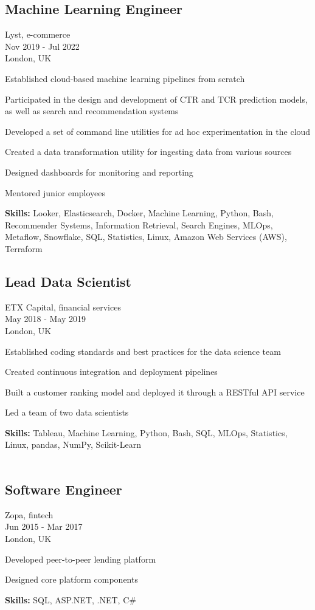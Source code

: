 \documentclass[a4paper,10pt]{article}
\begin{document}
\subsection*{Machine Learning Engineer}
Lyst, e-commerce \\
Nov 2019 - Jul 2022 \\
London, UK
\begin{bulletlist}
    \item Established cloud-based machine learning pipelines from scratch
    \item Participated in the design and development of CTR and TCR prediction models, as well as search and recommendation systems
    \item Developed a set of command line utilities for ad hoc experimentation in the cloud
    \item Created a data transformation utility for ingesting data from various sources
    \item Designed dashboards for monitoring and reporting
    \item Mentored junior employees
\end{bulletlist}
\textbf{Skills:} Looker, Elasticsearch, Docker, Machine Learning, Python, Bash, Recommender Systems, Information Retrieval, Search Engines, MLOps, Metaflow, Snowflake, SQL, Statistics, Linux, Amazon Web Services (AWS), Terraform

\subsection*{Lead Data Scientist}
ETX Capital, financial services \\
May 2018 - May 2019 \\
London, UK
\begin{bulletlist}
    \item Established coding standards and best practices for the data science team
    \item Created continuous integration and deployment pipelines
    \item Built a customer ranking model and deployed it through a RESTful API service
    \item Led a team of two data scientists
\end{bulletlist}
\textbf{Skills: }Tableau, Machine Learning, Python, Bash, SQL, MLOps, Statistics, Linux, pandas, NumPy, Scikit-Learn
\\
\\
\subsection*{Software Engineer}
Zopa, fintech \\
Jun 2015 - Mar 2017 \\
London, UK
\begin{bulletlist}
    \item Developed peer-to-peer lending platform
    \item Designed core platform components
\end{bulletlist}
\textbf{Skills:} SQL, ASP.NET, .NET, C\#
\end{document}
